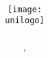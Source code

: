 \thispagestyle{empty}

\title{\bf \LARGE{\thesistitle} \\[3cm]}

\author{\DPhiltext \\[3cm]}

\date{\texttt{[image: \\unilogo]} \\[0.5cm]
\Large{\authorname} \\ 
\Large{\collegename}, \Large{\uniname} \\ 
\Large{\DPhildate}}

\maketitle
